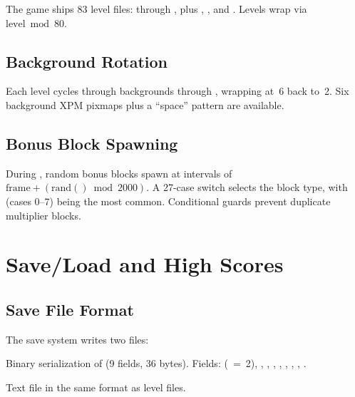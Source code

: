 \documentclass[11pt,a4paper]{article}
\begin{document}
The game ships 83 level files:  through , plus , , and . Levels wrap via $\text{level} \bmod 80$.

\subsection{Background Rotation}
\label{sec:bg-rotation}

Each level cycles through backgrounds  through , wrapping at~6 back to~2. Six background XPM pixmaps plus a ``space'' pattern are available.

\subsection{Bonus Block Spawning}
\label{sec:bonus-spawning}

During , random bonus blocks spawn at intervals of $\text{frame} + (\text{rand}() \bmod 2000)$. A 27-case switch selects the block type, with  (cases 0--7) being the most common. Conditional guards prevent duplicate multiplier blocks.


\section{Save/Load and High Scores}
\label{sec:save-load}

\subsection{Save File Format}
\label{sec:save-format}

The save system writes two files:

\begin{description}[style=nextline]
  \item[\file{\textasciitilde/.xboing-saveinfo}] Binary serialization of  (9 fields, 36 bytes). Fields:  (~=~2), , , , , , , , .
  \item[\file{\textasciitilde/.xboing-savelevel}] Text file in the same format as level files.
\end{description}
\end{document}
